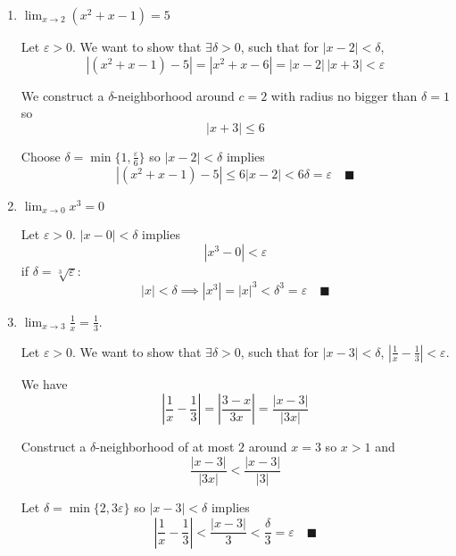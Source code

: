\documentclass[12pt]{article}
\newcommand{\qed}{\quad \blacksquare}
\newcommand{\abs}[1]{\left\vert #1 \right\vert}
\newcommand{\ep}{\varepsilon}
\begin{document}
\begin{enumerate}
	\item $\lim_{x\to 2}(x^2+x-1)=5$ 
	
        \color{blue}
            Let $\ep > 0$. We want to show that $\exists \delta > 0$, such that for $\abs{x - 2} < \delta$,
            \[\abs{(x^2 + x - 1) - 5} = \abs{x^2 + x - 6} = \abs{x - 2} \, \abs{x + 3} < \ep\]

            We construct a $\delta$-neighborhood around $c = 2$ with radius no bigger than $\delta = 1$ so 
            \[\abs{x + 3} \leq 6\]

            Choose $\delta = \min\{1, \frac{\ep}{6}\}$ so $\abs{x - 2} < \delta$ implies
            \[\abs{(x^2 + x - 1) - 5} \leq 6\abs{x - 2} < 6\delta = \ep \qed\]

        \color{black}

	\item $\lim_{x\to 0}x^3=0$
    
        \color{blue}
            Let $\ep > 0$. $\abs{x - 0} < \delta$ implies 
            \[\abs{x^3 - 0} < \ep\]
            if $\delta = \sqrt[3]{\ep}$:
            \[\abs{x} < \delta \implies \abs{x^3} = \abs{x}^3 < \delta^3 = \ep \qed\]

        \color{black}

	\item $\lim_{x\to 3}\frac{1}{x}=\frac{1}{3}$.
    
        \color{blue}
            Let $\ep > 0$. We want to show that $\exists \delta > 0$, such that for $\abs{x - 3} < \delta$, $\abs{\frac{1}{x} - \frac{1}{3}} < \ep$. 

            We have 
            \[\abs{\frac{1}{x} - \frac{1}{3}} = \abs{\frac{3 - x}{3x}} = \frac{\abs{x - 3}}{\abs{3x}}\]

            Construct a $\delta$-neighborhood of at most $2$ around $x = 3$ so $x > 1$ and 
            \[\frac{\abs{x-3}}{\abs{3x}} < \frac{\abs{x - 3}}{\abs{3}}\]

            Let $\delta = \min\{2, 3\ep\}$ so $\abs{x - 3} < \delta$ implies 
            \[\abs{\frac{1}{x} - \frac{1}{3}} < \frac{\abs{x-3}}{3} < \frac{\delta}{3} = \ep \qed\]
        \color{black}
\end{enumerate}


\pagebreak
\end{document}
